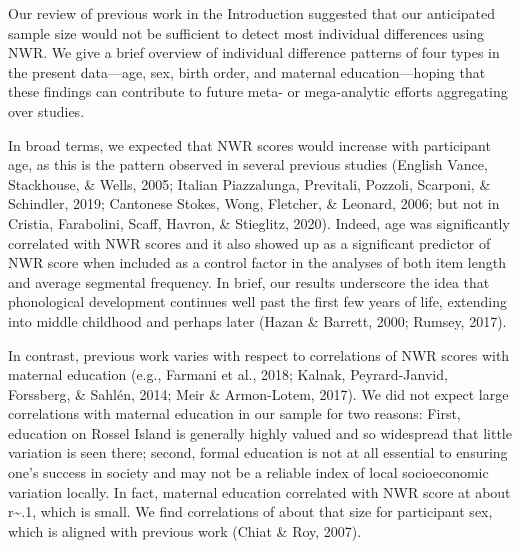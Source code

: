 \documentclass[
  american,
  ,man,floatsintext]{apa6}
\begin{document}
Our review of previous work in the Introduction suggested that our anticipated sample size would not be sufficient to detect most individual differences using NWR. We give a brief overview of individual difference patterns of four types in the present data---age, sex, birth order, and maternal education---hoping that these findings can contribute to future meta- or mega-analytic efforts aggregating over studies.

In broad terms, we expected that NWR scores would increase with participant age, as this is the pattern observed in several previous studies (English Vance, Stackhouse, \& Wells, 2005; Italian Piazzalunga, Previtali, Pozzoli, Scarponi, \& Schindler, 2019; Cantonese Stokes, Wong, Fletcher, \& Leonard, 2006; but not in Cristia, Farabolini, Scaff, Havron, \& Stieglitz, 2020). Indeed, age was significantly correlated with NWR scores and it also showed up as a significant predictor of NWR score when included as a control factor in the analyses of both item length and average segmental frequency. In brief, our results underscore the idea that phonological development continues well past the first few years of life, extending into middle childhood and perhaps later (Hazan \& Barrett, 2000; Rumsey, 2017).

In contrast, previous work varies with respect to correlations of NWR scores with maternal education (e.g., Farmani et al., 2018; Kalnak, Peyrard-Janvid, Forssberg, \& Sahlén, 2014; Meir \& Armon-Lotem, 2017). We did not expect large correlations with maternal education in our sample for two reasons: First, education on Rossel Island is generally highly valued and so widespread that little variation is seen there; second, formal education is not at all essential to ensuring one's success in society and may not be a reliable index of local socioeconomic variation locally. In fact, maternal education correlated with NWR score at about r\textasciitilde.1, which is small. We find correlations of about that size for participant sex, which is aligned with previous work (Chiat \& Roy, 2007).
\end{document}
